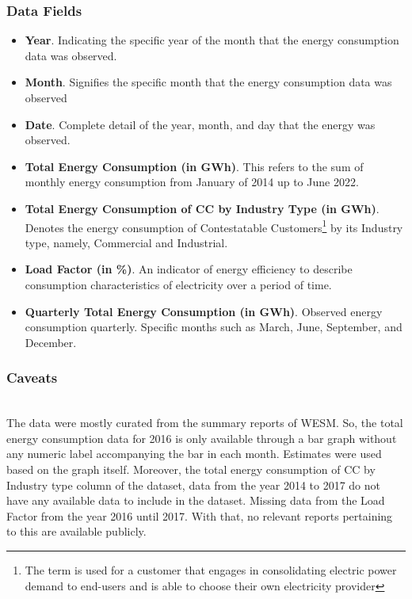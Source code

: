 \documentclass[runningheads]{llncs}
\begin{document}
\subsubsection{Data Fields}
\begin{itemize}
    \item \textbf{Year}. Indicating the specific year of the month that the energy consumption data was observed.
    \item \textbf{Month}. Signifies the specific month that the energy consumption data was observed
    \item \textbf{Date}. Complete detail of the year, month, and day that the energy was observed.
    \item \textbf{Total Energy Consumption (in GWh)}. This refers to the sum of monthly energy consumption from January of 2014 up to June 2022. 
    \item \textbf{Total Energy Consumption of CC by Industry Type (in GWh)}. Denotes the energy consumption of Contestatable Customers\footnote{The term is used for a customer that engages in consolidating electric power demand to end-users and is able to choose their own electricity provider} by its Industry type, namely, Commercial and Industrial.
    \item \textbf{Load Factor (in \%)}. An indicator of energy efficiency to describe consumption characteristics of electricity over a period of time.
    \item \textbf{Quarterly Total Energy Consumption (in GWh)}. Observed energy consumption quarterly. Specific months such as March, June, September, and December.  
\end{itemize}

\subsubsection{Caveats}~\\

The data were mostly curated from the summary reports of WESM. So, the total energy consumption data for 2016 is only available through a bar graph without any numeric label accompanying the bar in each month. Estimates were used based on the graph itself. Moreover, the total energy consumption of CC by Industry type column of the dataset, data from the year 2014 to 2017 do not have any available data to include in the dataset. Missing data from the Load Factor from the year 2016 until 2017. With that, no relevant reports pertaining to this are available publicly.
\end{document}
